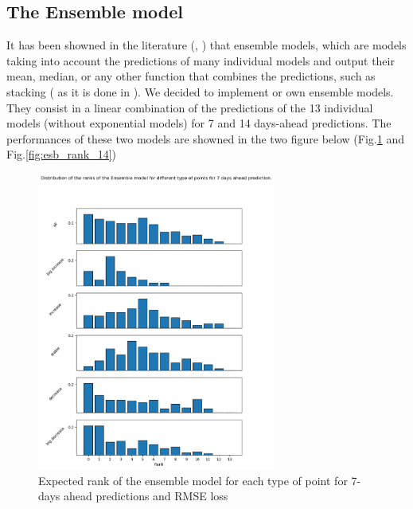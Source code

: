 \subsection{The Ensemble model}

It has been showned in the literature (\cite{cramer2022evaluation}, \cite{reich2019accuracy}) that ensemble models, which are models taking into account the predictions of many individual models and output their mean, median, or any other function that combines the predictions, such as stacking ( as it is done in \cite{reich2019accuracy} ).
We decided to implement or own ensemble models. 
They consist in a linear combination of the predictions of the 13 individual models (without exponential models) for 7 and 14 days-ahead predictions.
The performances of these two models are showned in the two figure below (Fig.\ref{fig:esb_rank_7} and Fig.\ref{fig:esb_rank_14})

\begin{figure}
    \centering
    \includegraphics[width=0.7\textwidth]{figures/esb_rank_7.png}
    \caption{Expected rank of the ensemble model for each type of point for 7-days ahead predictions and RMSE loss}
    \label{fig:esb_rank_7}
\end{figure}

